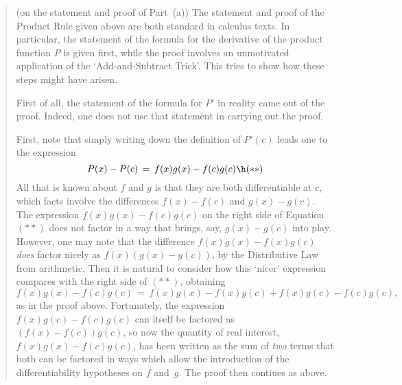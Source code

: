 \begin{quotation}
{\footnotesize \underline{\Note} (on the statement and proof of Part~(a))
    The statement and proof of the Product Rule given above are both standard in calculus texts. In particular,
    the statement of the formula for the derivative of the product function $P$ is given first, while the proof involves an unmotivated application of the `Add-and-Subtract Trick'.
    This {\Note} tries to show how these steps might have arisen.

        First of all, the statement of the formula for $P'$ in reality came out of the proof. Indeed, one does not use that statement in carrying out the proof. %

        First, note that simply writing down the definition of $P'(c)$ leads one to the expression
        \begin{displaymath}
        P(x) - P(c) \,=\, f(x)g(x) - f(c)g(c) \h ({\ast}{\ast})
        \end{displaymath}
    All that is known about $f$ and $g$ is that they are both differentiable at $c$, which facts involve the differences $f(x) - f(c)$ and $g(x) - g(c)$.
    The expression $f(x)g(x) - f(c)g(c)$ on the right side of Equation~$({\ast}{\ast})$ does not factor in a way that brings, say, $g(x) - g(c)$ into play.
    However, one may note that the difference $f(x)g(x) - f(x)g(c)$ {\em does} factor nicely as $f(x)(g(x) - g(c))$,  by the Distributive Law from arithmetic.
    Then it is natural to consider how this `nicer' expression compares with the right side of $({\ast}{\ast})$, obtaining
        \begin{displaymath}
        f(x)g(x) - f(c)g(c) \,=\, f(x)g(x) - f(x)g(c) + f(x)g(c) - f(c)g(c),
        \end{displaymath}
    as in the proof above. Fortunately, the expression $f(x)g(c) - f(c)g(c)$ can itself be factored as $(f(x) - f(c))g(c)$,
    so now the quantity of real interest, $f(x)g(x) - f(c)g(c)$, has been written as the sum of {\em two} terms
    that both can be factored in ways which allow the introduction of the differentiability hypotheses on $f$ and~$g$.
    The proof then contiues as above.

}%
\end{quotation}



\VV

